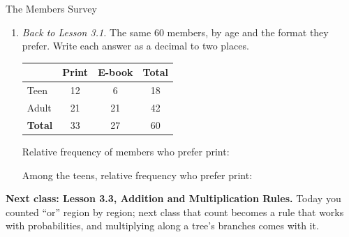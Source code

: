 \documentclass[12pt]{article}
\begin{document}
\begin{notesbox}{The Members Survey}
\begin{enumerate}[leftmargin=1.6em, itemsep=5pt, topsep=2pt, start=3]
  \item \emph{Back to Lesson 3.1.} The same $60$ members, by age and the format they prefer.
        Write each answer as a decimal to two places.

        \begin{center}
        \renewcommand{\arraystretch}{1.15}
        \begin{tabular}{@{} l c c c @{}}
        \toprule
        & \textbf{Print} & \textbf{E-book} & \textbf{Total} \\
        \midrule
        Teen & 12 & 6 & 18 \\
        Adult & 21 & 21 & 42 \\
        \textbf{Total} & 33 & 27 & 60 \\
        \bottomrule
        \end{tabular}
        \end{center}
        \vspace{-3pt}
        Relative frequency of members who prefer print: \hfill {}
        \par\vspace{2pt}
        Among the teens, relative frequency who prefer print: \hfill {}

\end{enumerate}
\end{notesbox}

\boxguard[5]
\begin{spiralbox}
\textbf{Next class: Lesson 3.3, Addition and Multiplication Rules.} Today you counted ``or''
region by region; next class that count becomes a rule that works with probabilities, and
multiplying along a tree's branches comes with it.
\end{spiralbox}
\end{document}

